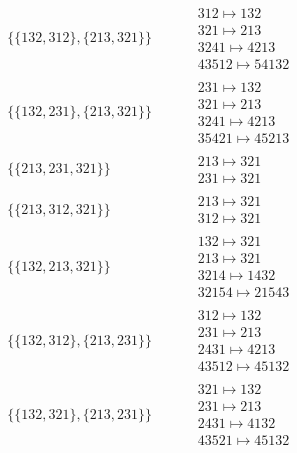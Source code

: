 \begin{tiny}
\begin{align}
\begin{matrix}
\end{matrix}
\\
\{\{132, 312\}, \{213, 321\}\}
\quad
&
\phantom{.}
&
\begin{matrix}
312 \mapsto 132\\321 \mapsto 213\\3241 \mapsto 4213\\43512 \mapsto 54132
\end{matrix}
\\
\{\{132, 231\}, \{213, 321\}\}
\quad
&
\phantom{.}
&
\begin{matrix}
231 \mapsto 132\\321 \mapsto 213\\3241 \mapsto 4213\\35421 \mapsto 45213
\end{matrix}
\\
\{\{213, 231, 321\}\}
\quad
&
\phantom{.}
&
\begin{matrix}
213 \mapsto 321\\231 \mapsto 321
\end{matrix}
\\
\{\{213, 312, 321\}\}
\quad
&
\phantom{.}
&
\begin{matrix}
213 \mapsto 321\\312 \mapsto 321
\end{matrix}
\\
\{\{132, 213, 321\}\}
\quad
&
\phantom{.}
&
\begin{matrix}
132 \mapsto 321\\213 \mapsto 321\\3214 \mapsto 1432\\32154 \mapsto 21543
\end{matrix}
\\
\{\{132, 312\}, \{213, 231\}\}
\quad
&
\phantom{.}
&
\begin{matrix}
312 \mapsto 132\\231 \mapsto 213\\2431 \mapsto 4213\\43512 \mapsto 45132
\end{matrix}
\\
\{\{132, 321\}, \{213, 231\}\}
\quad
&
\phantom{.}
&
\begin{matrix}
321 \mapsto 132\\231 \mapsto 213\\2431 \mapsto 4132\\43521 \mapsto 45132
\end{matrix}
\\

\end{align}
\end{tiny}
